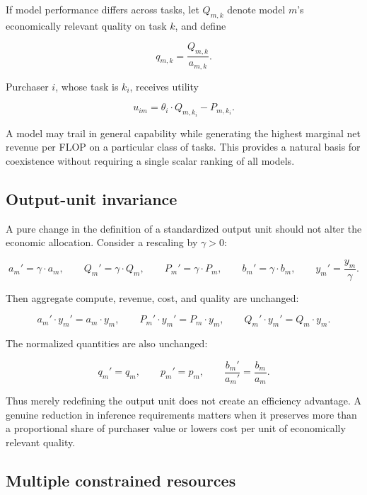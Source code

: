 \documentclass[11pt]{article}
\begin{document}
If model performance differs across tasks, let $Q_{m,k}$ denote model $m$'s economically relevant quality on task $k$, and define

\begin{equation}q_{m,k}=\frac{Q_{m,k}}{a_{m,k}}.\end{equation}

Purchaser $i$, whose task is $k_i$, receives utility

\begin{equation}u_{im}=\theta_i\cdot Q_{m,k_i}-P_{m,k_i}.\end{equation}

A model may trail in general capability while generating the highest marginal net revenue per FLOP on a particular class of tasks. This provides a natural basis for coexistence without requiring a single scalar ranking of all models.

\subsection{Output-unit invariance}

A pure change in the definition of a standardized output unit should not alter the economic allocation. Consider a rescaling by $\gamma>0$:

\begin{equation}a_m'=\gamma\cdot a_m,\qquad Q_m'=\gamma\cdot Q_m,\qquad P_m'=\gamma\cdot P_m,\qquad b_m'=\gamma\cdot b_m,\qquad y_m'=\frac{y_m}{\gamma}.\end{equation}

Then aggregate compute, revenue, cost, and quality are unchanged:

\begin{equation}a_m'\cdot y_m'=a_m\cdot y_m,\qquad P_m'\cdot y_m'=P_m\cdot y_m,\qquad Q_m'\cdot y_m'=Q_m\cdot y_m.\end{equation}

The normalized quantities are also unchanged:

\begin{equation}q_m'=q_m,\qquad p_m'=p_m,\qquad \frac{b_m'}{a_m'}=\frac{b_m}{a_m}.\end{equation}

Thus merely redefining the output unit does not create an efficiency advantage. A genuine reduction in inference requirements matters when it preserves more than a proportional share of purchaser value or lowers cost per unit of economically relevant quality.

\subsection{Multiple constrained resources}
\end{document}
